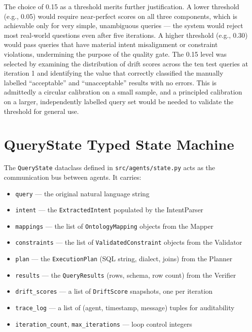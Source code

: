 \documentclass[12pt,a4paper]{report}
\begin{document}
The choice of 0.15 as a threshold merits further justification. A lower threshold (e.g., 0.05) would require near-perfect scores on all three components, which is achievable only for very simple, unambiguous queries — the system would reject most real-world questions even after five iterations. A higher threshold (e.g., 0.30) would pass queries that have material intent misalignment or constraint violations, undermining the purpose of the quality gate. The 0.15 level was selected by examining the distribution of drift scores across the ten test queries at iteration 1 and identifying the value that correctly classified the manually labelled ``acceptable'' and ``unacceptable'' results with no errors. This is admittedly a circular calibration on a small sample, and a principled calibration on a larger, independently labelled query set would be needed to validate the threshold for general use.

\section{QueryState Typed State Machine}
\label{sec:querystate}

The \texttt{QueryState} dataclass defined in \texttt{src/agents/state.py} acts as the communication bus between agents. It carries:

\begin{itemize}[leftmargin=2em]
  \item \texttt{query} — the original natural language string
  \item \texttt{intent} — the \texttt{ExtractedIntent} populated by the IntentParser
  \item \texttt{mappings} — the list of \texttt{OntologyMapping} objects from the Mapper
  \item \texttt{constraints} — the list of \texttt{ValidatedConstraint} objects from the Validator
  \item \texttt{plan} — the \texttt{ExecutionPlan} (SQL string, dialect, joins) from the Planner
  \item \texttt{results} — the \texttt{QueryResults} (rows, schema, row count) from the Verifier
  \item \texttt{drift\_scores} — a list of \texttt{DriftScore} snapshots, one per iteration
  \item \texttt{trace\_log} — a list of (agent, timestamp, message) tuples for auditability
  \item \texttt{iteration\_count}, \texttt{max\_iterations} — loop control integers
\end{itemize}
\end{document}
